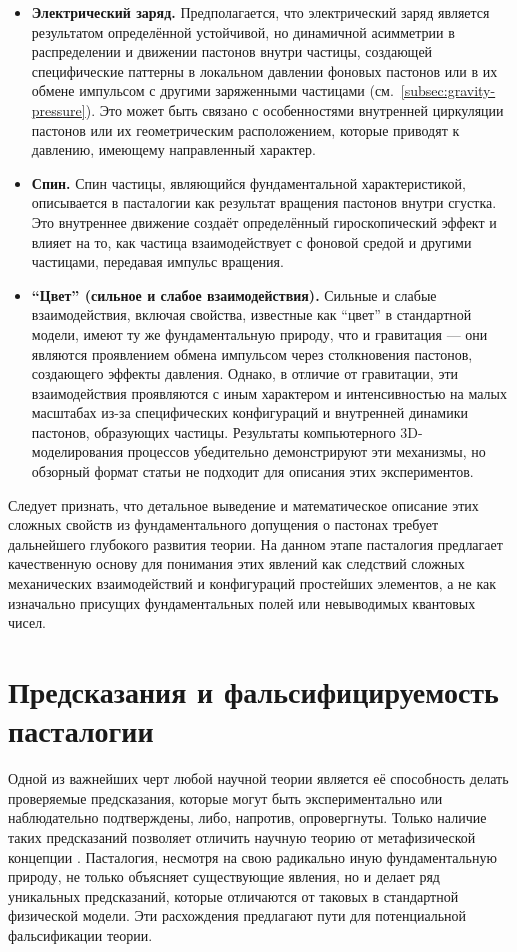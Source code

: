 \documentclass[pdflatex,sn-mathphys-num,referee]{sn-jnl}
\begin{document}
\begin{itemize}
    \item \textbf{Электрический заряд.} Предполагается, что электрический заряд является результатом определённой устойчивой, но динамичной асимметрии в распределении и движении пастонов внутри частицы, создающей специфические паттерны в локальном давлении фоновых пастонов или в их обмене импульсом с другими заряженными частицами (см.~\ref{subsec:gravity-pressure}). Это может быть связано с особенностями внутренней циркуляции пастонов или их геометрическим расположением, которые приводят к давлению, имеющему направленный характер.
    \item \textbf{Спин.} Спин частицы, являющийся фундаментальной характеристикой, описывается в пасталогии как результат вращения пастонов внутри сгустка. Это внутреннее движение создаёт определённый гироскопический эффект и влияет на то, как частица взаимодействует с фоновой средой и другими частицами, передавая импульс вращения.
    \item \textbf{``Цвет'' (сильное и слабое взаимодействия).} Сильные и слабые взаимодействия, включая свойства, известные как ``цвет'' в стандартной модели, имеют ту же фундаментальную природу, что и гравитация --- они являются проявлением обмена импульсом через столкновения пастонов, создающего эффекты давления. Однако, в отличие от гравитации, эти взаимодействия проявляются с иным характером и интенсивностью на малых масштабах из-за специфических конфигураций и внутренней динамики пастонов, образующих частицы. Результаты компьютерного 3D-моделирования процессов убедительно демонстрируют эти механизмы, но обзорный формат статьи не подходит для описания этих экспериментов.
\end{itemize}

Следует признать, что детальное выведение и математическое описание этих сложных свойств из фундаментального допущения о пастонах требует дальнейшего глубокого развития теории. На данном этапе пасталогия предлагает качественную основу для понимания этих явлений как следствий сложных механических взаимодействий и конфигураций простейших элементов, а не как изначально присущих фундаментальных полей или невыводимых квантовых чисел.

\section{Предсказания и фальсифицируемость пасталогии}\label{sec:predictions}

Одной из важнейших черт любой научной теории является её способность делать проверяемые предсказания, которые могут быть экспериментально или наблюдательно подтверждены, либо, напротив, опровергнуты. Только наличие таких предсказаний позволяет отличить научную теорию от метафизической концепции \cite{popper1959}. Пасталогия, несмотря на свою радикально иную фундаментальную природу, не только объясняет существующие явления, но и делает ряд уникальных предсказаний, которые отличаются от таковых в стандартной физической модели. Эти расхождения предлагают пути для потенциальной фальсификации теории.
\end{document}
